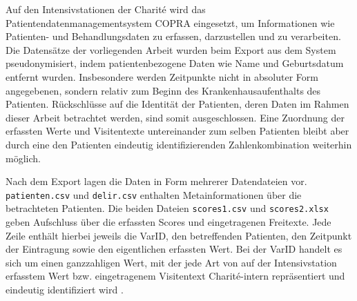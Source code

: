 Auf den Intensivstationen der Charité wird das Patientendatenmanagementsystem COPRA eingesetzt, um Informationen wie Patienten- und Behandlungsdaten zu erfassen, darzustellen und zu verarbeiten. Die Datensätze der vorliegenden Arbeit wurden beim Export aus dem System pseudonymisiert, indem patientenbezogene Daten wie Name und Geburtsdatum entfernt wurden. Insbesondere werden Zeitpunkte nicht in absoluter Form angegebenen, sondern relativ zum Beginn des Krankenhausaufenthalts des Patienten. Rückschlüsse auf die Identität der Patienten, deren Daten im Rahmen dieser Arbeit betrachtet werden, sind somit ausgeschlossen. Eine Zuordnung der erfassten Werte und Visitentexte untereinander zum selben Patienten bleibt aber durch eine den Patienten eindeutig identifizierenden Zahlenkombination weiterhin möglich.

Nach dem Export lagen die Daten in Form mehrerer Datendateien vor. \texttt{patienten.csv} und \texttt{delir.csv} enthalten Metainformationen über die betrachteten Patienten. Die beiden Dateien \texttt{scores1.csv} und \texttt{scores2.xlsx} geben Aufschluss über die erfassten Scores und eingetragenen Freitexte. Jede Zeile enthält hierbei jeweils die VarID, den betreffenden Patienten, den Zeitpunkt der Eintragung sowie den eigentlichen erfassten Wert. Bei der VarID handelt es sich um einen ganzzahligen Wert, mit der jede Art von auf der Intensivstation erfasstem Wert bzw. eingetragenem Visitentext Charité-intern repräsentiert und eindeutig identifiziert wird .

